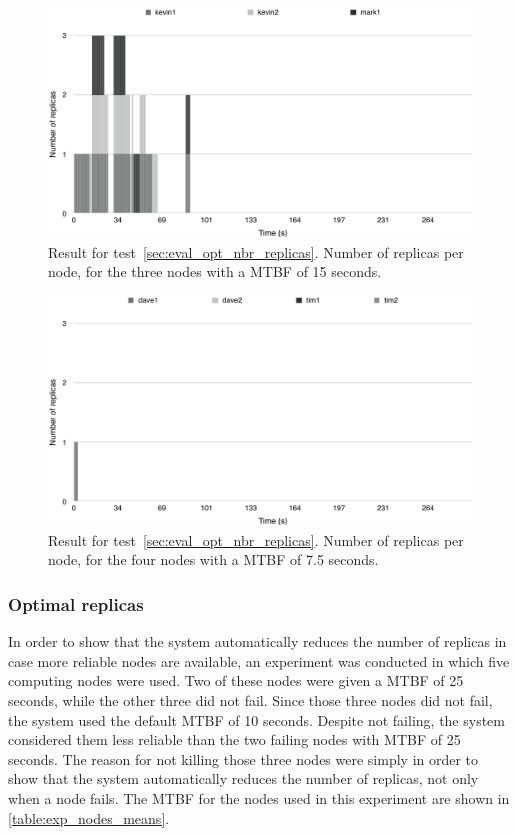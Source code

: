 \documentclass{cslthse-msc}
\begin{document}
\begin{figure}[!hbt]
\centering
\includegraphics[scale=0.5]{images/results/optimal_replicas/MTBF_15.pdf}
\caption{Result for test~\ref{sec:eval_opt_nbr_replicas}. Number of replicas per node, for the three nodes with a MTBF of 15 seconds.} \label{fig:exp_opt_replicas_MTBF_15}
\end{figure}

\begin{figure}[!hbt]
\centering
\includegraphics[scale=0.5]{images/results/optimal_replicas/MTBF_75.pdf}
\caption{Result for test~\ref{sec:eval_opt_nbr_replicas}. Number of replicas per node, for the four nodes with a MTBF of 7.5 seconds.} \label{fig:exp_opt_replicas_MTBF_75}
\end{figure}

\subsubsection{Optimal replicas}
\label{sec:eval_opt_nbr_replicas_2}
In order to show that the system automatically reduces the number of replicas in case more reliable nodes are available, an experiment was conducted in which five computing nodes were used. Two of these nodes were given a MTBF of 25 seconds, while the other three did not fail. Since those three nodes did not fail, the system used the default MTBF of 10 seconds. Despite not failing, the system considered them less reliable than the two failing nodes with MTBF of 25 seconds. The reason for not killing those three nodes were simply in order to show that the system automatically reduces the number of replicas, not only when a node fails. The MTBF for the nodes used in this experiment are shown in \cref{table:exp_nodes_means}.
\end{document}
